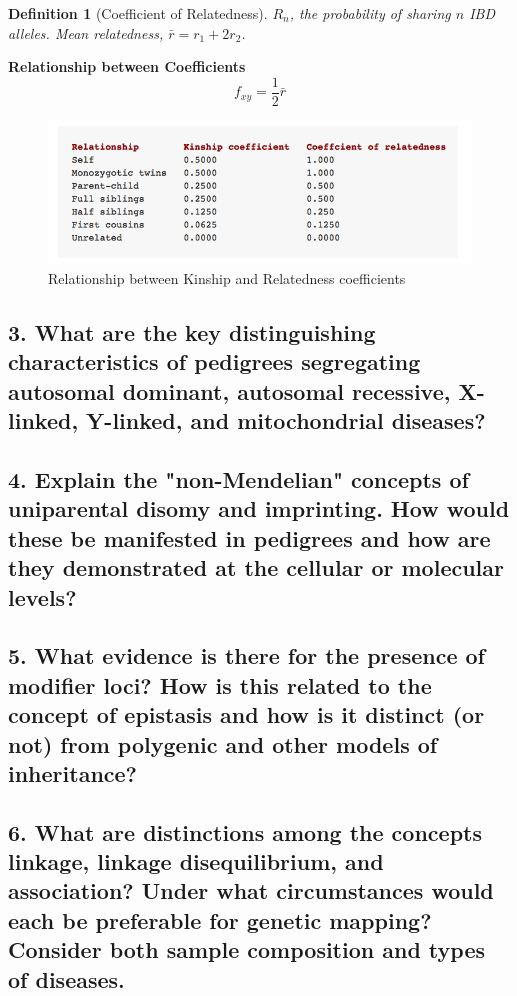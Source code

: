 \documentclass{tufte-handout}
\newtheorem*{define}{Definition}
\begin{document}
\begin{define}[Coefficient of Relatedness]
$R_n$, the probability of sharing $n$ IBD alleles. Mean relatedness, $\bar{r} = r_1 + 2r_2$.
\end{define}

\noindent
\textbf{Relationship between Coefficients}
\[f_{xy} = \frac{1}{2}\bar{r}\]
\begin{figure}
\includegraphics[scale=0.5]{./figs/kinrelate}
\caption{Relationship between Kinship and Relatedness coefficients}
\end{figure}


\newpage
\subsection{3.
What are the key distinguishing characteristics of pedigrees segregating autosomal dominant, autosomal recessive, X-linked, Y-linked, and mitochondrial diseases?}
\label{subsec:03}

\subsection{4.
Explain the "non-Mendelian" concepts of uniparental disomy and imprinting. How would these be manifested in pedigrees and how are they demonstrated at the cellular or molecular levels?}
\label{subsec:04}

\subsection{5.
What evidence is there for the presence of modifier loci? How is this related to the concept of epistasis and how is it distinct (or not) from polygenic and other models of inheritance?}
\label{subsec:05}

\subsection{6.
What are distinctions among the concepts linkage, linkage disequilibrium, and association? Under what circumstances would each be preferable for genetic mapping? Consider both sample composition and types of diseases.}
\label{subsec:06}
\end{document}
